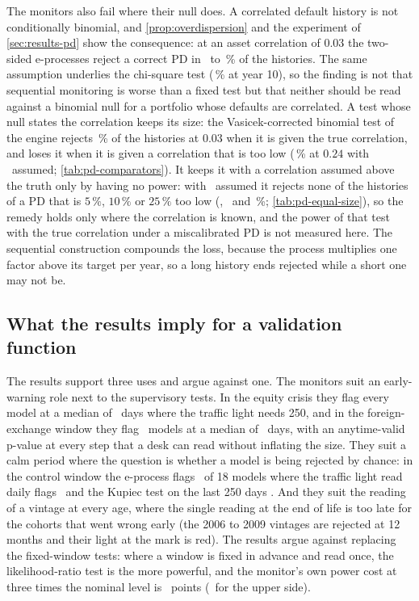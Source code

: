The monitors also fail where their null does. A correlated default history is not conditionally binomial, and \cref{prop:overdispersion} and the experiment of \cref{sec:results-pd} show the consequence: at an asset correlation of $0.03$ the two-sided e-processes reject a correct PD in \nRhoZeroThreeProd\ to \nRhoZeroThreeAvg\,\% of the histories. The same assumption underlies the chi-square test (\nRhoZeroThreeChiOne\,\% at year 10), so the finding is not that sequential monitoring is worse than a fixed test but that neither should be read against a binomial null for a portfolio whose defaults are correlated. A test whose null states the correlation keeps its size: the Vasicek-corrected binomial test of the engine rejects \nPdcZeroThreeVasTrueEvery\,\% of the histories at $0.03$ when it is given the true correlation, and loses it when it is given a correlation that is too low (\nPdcTwoFourVasAssumedEvery\,\% at $0.24$ with \nPdcAssumedRho\ assumed; \cref{tab:pd-comparators}). It keeps it with a correlation assumed above the truth only by having no power: with \nPdcAssumedRho\ assumed it rejects none of the histories of a PD that is $5\,\%$, $10\,\%$ or $25\,\%$ too low (\nPdcOneZeroFiveVasAssumedEvery, \nPdcOneOneVasAssumedEvery\ and \nPdcOneTwoFiveVasAssumedEvery\,\%; \cref{tab:pd-equal-size}), so the remedy holds only where the correlation is known, and the power of that test with the true correlation under a miscalibrated PD is not measured here. The sequential construction compounds the loss, because the process
multiplies one factor above its target per year, so a long history ends rejected while a short one may not be.

\subsection{What the results imply for a validation function}
\label{sec:discussion-use}

The results support three uses and argue against one. The monitors suit an early-warning role next to the supervisory tests. In the equity crisis they flag every model at a median of \nCElevenEquityNinetyEMed\ days where the traffic light needs 250, and in the foreign-exchange window they flag \nCElevenFxNinetyEFlag\ models at a median of \nCElevenFxNinetyEMed\ days, with an anytime-valid p-value at every step that a desk can read without inflating the size. They suit a calm period where the question is whether a model is being rejected by chance: in the control window the e-process flags \nCElevenCalmNinetyEFlag\ of 18 models where the traffic light read daily flags
\nCElevenCalmNinetyLightFlag\ and the Kupiec test on the last 250 days \nCElevenCalmNinetyKupTrailFlag. And they suit the reading of a vintage at every age, where the single reading at the end of life is too late for the cohorts that went wrong early (the 2006 to 2009 vintages are rejected at 12 months and their light at the mark is red).
The results argue against replacing the fixed-window tests: where a window is fixed in advance and read once, the likelihood-ratio test is the more powerful, and the monitor's own power cost at three times the nominal level is \nSeedsThreeCost\ points (\nSeedsUpThreeCost\ for the upper side).


